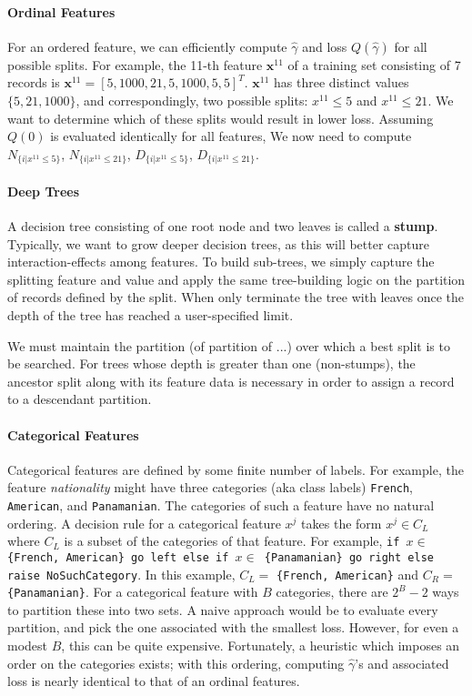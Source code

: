 \documentclass{article}
\newcommand{\vx}[0]{\mathbf{x}}
\begin{document}
\paragraph{Ordinal Features}

For an ordered feature, we can efficiently compute $\hat \gamma$ and
loss $Q(\hat \gamma)$ for all possible splits.  For example, the 11-th
feature $\vx^{11}$ of a training set consisting of 7 records is
$\vx^{11} = [5,1000,21,5,1000,5,5]^T$.  $\vx^{11}$ has three distinct
values $\{5,21,1000\}$, and correspondingly, two possible splits:
$x^{11} \le 5$ and $x^{11} \le 21$.  We want to determine which of
these splits would result in lower loss.  Assuming $Q(0)$ is evaluated
identically for all features, We now need to compute $N_{\{i| x^{11}
  \le 5\}}$, $N_{\{i| x^{11} \le 21\}}$, $D_{\{i| x^{11} \le 5\}}$,
$D_{\{i| x^{11} \le 21\}}$.

\paragraph{Deep Trees}

A decision tree consisting of one root node and two leaves is called a
{\bf stump}.  Typically, we want to grow deeper decision trees, as
this will better capture interaction-effects among features.  To build
sub-trees, we simply capture the splitting feature and value and apply
the same tree-building logic on the partition of records defined by
the split.  When only terminate the tree with leaves once the depth of
the tree has reached a user-specified limit.

We must maintain the partition (of partition of ...) over which a best
split is to be searched.  For trees whose depth is greater than one
(non-stumps), the ancestor split along with its feature data is
necessary in order to assign a record to a descendant partition.

\paragraph{Categorical Features}

Categorical features are defined by some finite number of labels.  For
example, the feature {\em nationality} might have three categories
(aka class labels) \texttt{French}, \texttt{American}, and
\texttt{Panamanian}.  The categories of such a feature have no natural
ordering.  A decision rule for a categorical feature $x^j$ takes the
form $x^j \in C_L$ where $C_L$ is a subset of the categories of that
feature.  For example, \texttt{if $x \in$ \{French, American\} go left
  else if $x \in$ \{Panamanian\} go right else raise NoSuchCategory}.
In this example, $C_L =$ \texttt{\{French, American\}} and $C_R =$
\texttt{\{Panamanian\}}.  For a categorical feature with $B$
categories, there are $2^B - 2$ ways to partition these into two sets.
A naive approach would be to evaluate every partition, and pick the
one associated with the smallest loss.  However, for even a modest
$B$, this can be quite expensive.  Fortunately, a heuristic which
imposes an order on the categories exists; with this ordering,
computing $\hat \gamma$'s and associated loss is nearly identical to
that of an ordinal features.
\end{document}
